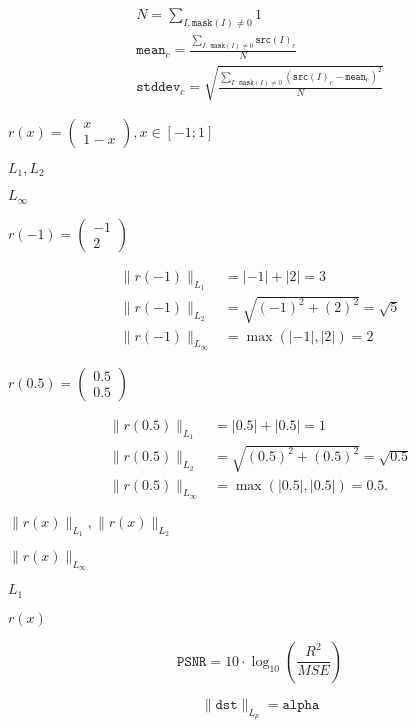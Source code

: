 \documentclass{article}
\begin{document}
\[\begin{array}{l} N = \sum _{I, \texttt{mask} (I) \ne 0} 1 \\ \texttt{mean} _c = \frac{\sum_{ I: \; \texttt{mask}(I) \ne 0} \texttt{src} (I)_c}{N} \\ \texttt{stddev} _c = \sqrt{\frac{\sum_{ I: \; \texttt{mask}(I) \ne 0} \left ( \texttt{src} (I)_c - \texttt{mean} _c \right )^2}{N}} \end{array}\]
\pagebreak

$r(x)= \begin{pmatrix} x \\ 1-x \end{pmatrix}, x \in [-1;1]$
\pagebreak

$ L_{1}, L_{2} $
\pagebreak

$ L_{\infty} $
\pagebreak

$r(-1) = \begin{pmatrix} -1 \\ 2 \end{pmatrix}$
\pagebreak

\begin{align*} \| r(-1) \|_{L_1} &= |-1| + |2| = 3 \\ \| r(-1) \|_{L_2} &= \sqrt{(-1)^{2} + (2)^{2}} = \sqrt{5} \\ \| r(-1) \|_{L_\infty} &= \max(|-1|,|2|) = 2 \end{align*}
\pagebreak

$r(0.5) = \begin{pmatrix} 0.5 \\ 0.5 \end{pmatrix}$
\pagebreak

\begin{align*} \| r(0.5) \|_{L_1} &= |0.5| + |0.5| = 1 \\ \| r(0.5) \|_{L_2} &= \sqrt{(0.5)^{2} + (0.5)^{2}} = \sqrt{0.5} \\ \| r(0.5) \|_{L_\infty} &= \max(|0.5|,|0.5|) = 0.5. \end{align*}
\pagebreak

$\| r(x) \|_{L_1}, \| r(x) \|_{L_2}$
\pagebreak

$\| r(x) \|_{L_\infty}$
\pagebreak

$ L_{1} $
\pagebreak

$ r(x) $
\pagebreak

\[ \texttt{PSNR} = 10 \cdot \log_{10}{\left( \frac{R^2}{MSE} \right) } \]
\pagebreak

\[\| \texttt{dst} \| _{L_p}= \texttt{alpha}\]
\pagebreak
\end{document}
